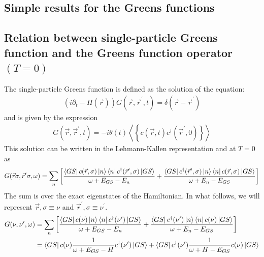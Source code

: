 \documentclass[10pt]{report}
\numberwithin{equation}{section}
\begin{document}
\begin{appendices}
\chapter{Simple results for the Greens functions}
\section{Relation between single-particle Greens function and the Greens function operator $(T=0)$}
 The single-particle Greens function is defined as the solution of the equation:
 \begin{equation}\begin{aligned}
	 \left(i\partial_t - H(\vec r)\right)G(\vec r,\vec r^\prime, t) = \delta(\vec r - \vec r^\prime)
 \end{aligned}\end{equation}
 and is given by the expression
 \begin{equation}\begin{aligned}
	 G(\vec r,\vec r^\prime, t) = -i \theta(t) \left< \left\{ c(\vec r, t) c^\dagger(\vec r^\prime, 0)\right\} \right>
 \end{aligned}\end{equation}
 This solution can be written in the Lehmann-Kallen representation  and at $T=0$ as
 \begin{equation}\begin{aligned}
	 G(\vec r \sigma, \vec r^\prime \sigma, \omega) = \sum_{n}\left[\frac{\bra{GS}c({\vec r,\sigma})\ket{n}\bra{n}c^\dagger(\vec r^\prime,\sigma)\ket{GS}}{\omega + E_{GS} - E_n} + \frac{\bra{GS}c^\dagger(\vec r^\prime,\sigma)\ket{n}\bra{n}c({\vec r,\sigma})\ket{GS}}{\omega + E_n - E_{GS}}\right]
 \end{aligned}\end{equation}
 The sum is over the exact eigenstates of the Hamiltonian. In what follows, we will represent $\vec r,\sigma \equiv \nu$ and $\vec r^\prime,\sigma \equiv \nu^\prime$.
 \begin{equation}\begin{aligned}
	 G(\nu, \nu^\prime, \omega) &= \sum_{n}\left[\frac{\bra{GS}c(\nu)\ket{n}\bra{n}c^\dagger(\nu^\prime)\ket{GS}}{\omega + E_{GS} - E_n} + \frac{\bra{GS}c^\dagger(\nu^\prime)\ket{n}\bra{n}c(\nu)\ket{GS}}{\omega + E_n - E_{GS}}\right]\\
							&= \bra{GS}c(\nu)\frac{1}{\omega + E_{GS} - H}c^\dagger(\nu^\prime)\ket{GS} + \bra{GS}c^\dagger(\nu^\prime)\frac{1}{\omega + H - E_{GS}}c(\nu)\ket{GS}\\
 \end{aligned}\end{equation}

\end{appendices}
\end{document}

